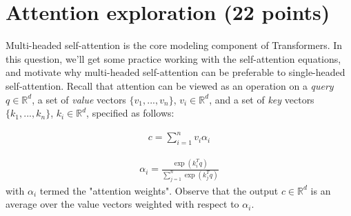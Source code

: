 \documentclass[letterpaper,12pt]{article}
\begin{document}
	
	\renewcommand{\figurename}{Figure} %
	\renewcommand{\contentsname}{Contents}
	\renewcommand{\tablename}{Table}
	
	\section{Attention exploration (22 points)}
	
	\noindent Multi-headed self-attention is the core modeling component of Transformers. In this question, we'll get some practice working with the self-attention equations, and motivate why multi-headed self-attention can be preferable to single-headed self-attention.
	Recall that attention can be viewed as an operation on a \textit{query} $q \in \mathbb{R}^d$, a set of \textit{value} vectors $\{v_1, . . . , v_n \}$, $v_i \in \mathbb{R}^d$, and a set of \textit{key} vectors $\{k_1, . . . , k_n\}$, $k_i \in \mathbb{R}^d$, specified as follows:
	
	\begin{equation}
		\begin{aligned}
			c = \sum_{i=1}^{n} v_{i}\alpha_{i}
		\end{aligned}
		\label{eq: Attention_formula_1}
	\end{equation}
	
	\begin{equation}
		\begin{aligned}
			\alpha_{i} = \frac{\exp(k_{i}^{T}q)}{\sum_{j=1}^{n} \exp(k_{j}^{T}q)}
		\end{aligned}
		\label{eq: Attention_formula_2}
	\end{equation}
	with $\alpha_i$ termed the "attention weights". Observe that the output $c \in \mathbb{R}^d$ is an average over the value vectors weighted with respect to $\alpha_i$.
\end{document}
